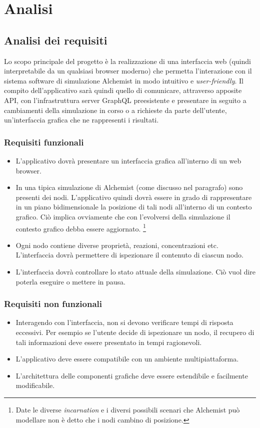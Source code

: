 \chapter{Analisi}

\section{Analisi dei requisiti}
Lo scopo principale del progetto è la realizzazione di una interfaccia web (quindi interpretabile da un qualsiasi browser moderno) che permetta l'interazione con il sistema software di simulazione
Alchemist in modo intuitivo e \textit{user-friendly}. Il compito dell'applicativo sarà quindi quello di comunicare, attraverso apposite \ac{API}, con l'infrastruttura server GraphQL preesistente e presentare in seguito a cambiamenti della simulazione in corso o a richieste da parte dell'utente, un'interfaccia grafica che ne rappresenti i risultati.
\subsection{Requisiti funzionali}
\begin{itemize}
	\item L'applicativo dovrà presentare un interfaccia grafica all'interno di un web browser.
	\item In una tipica simulazione di Alchemist (come discusso nel paragrafo) sono presenti dei nodi. L'applicativo quindi dovrà essere in grado di rappresentare in un piano bidimensionale la posizione di tali nodi all'interno di un contesto grafico. Ciò implica ovviamente che con l'evolversi della simulazione il contesto grafico debba essere aggiornato. \footnote{Date le diverse \textit{incarnation} e i diversi possibili scenari che Alchemist può modellare non è detto che i nodi cambino di posizione.}
	\item Ogni nodo contiene diverse proprietà, reazioni, concentrazioni etc. L'interfaccia dovrà permettere di ispezionare il contenuto di ciascun nodo. 
	\item L'interfaccia dovrà controllare lo stato attuale della simulazione. Ciò vuol dire poterla eseguire o mettere in pausa.
\end{itemize}

\subsection{Requisiti non funzionali}
\begin{itemize}
	\item Interagendo con l'interfaccia, non si devono verificare tempi di risposta eccessivi. Per esempio se l'utente decide di ispezionare un nodo, il recupero di tali informazioni deve essere presentato in tempi ragionevoli.
	\item L'applicativo deve essere compatibile con un ambiente multipiattaforma.
	\item L'architettura delle componenti grafiche deve essere estendibile e facilmente modificabile.
\end{itemize}

